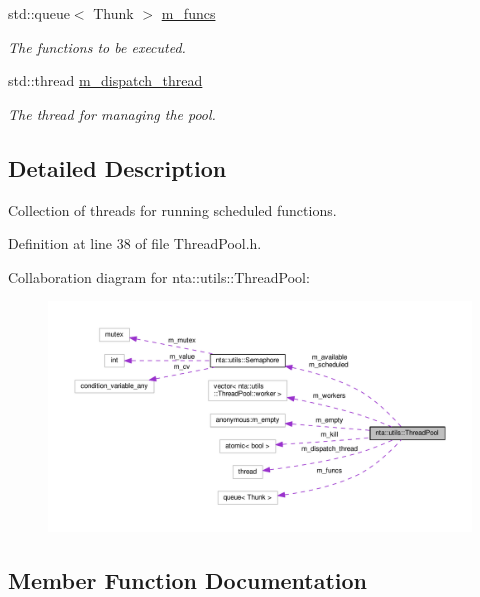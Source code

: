 \begin{DoxyCompactItemize}
std\+::queue$<$ Thunk $>$ \hyperlink{classnta_1_1utils_1_1ThreadPool_a828f1c41f02f5ecce36e72a2a3328eb3}{m\+\_\+funcs}
\begin{DoxyCompactList}\small\item\em The functions to be executed. \end{DoxyCompactList}\item 
\mbox{\label{classnta_1_1utils_1_1ThreadPool_a6fe6bfa4607803f5f3f9b64b47c0417a}} 
std\+::thread \hyperlink{classnta_1_1utils_1_1ThreadPool_a6fe6bfa4607803f5f3f9b64b47c0417a}{m\+\_\+dispatch\+\_\+thread}
\begin{DoxyCompactList}\small\item\em The thread for managing the pool. \end{DoxyCompactList}\end{DoxyCompactItemize}


\subsection{Detailed Description}
Collection of threads for running scheduled functions. 

Definition at line 38 of file Thread\+Pool.\+h.



Collaboration diagram for nta\+:\+:utils\+:\+:Thread\+Pool\+:
\nopagebreak
\begin{figure}[H]
\begin{center}
\leavevmode
\includegraphics[width=350pt]{d2/d5d/classnta_1_1utils_1_1ThreadPool__coll__graph}
\end{center}
\end{figure}


\subsection{Member Function Documentation}
\mbox{\label{classnta_1_1utils_1_1ThreadPool_a2ca98ba5ed4510e5aac90c0507859b8d}} 
